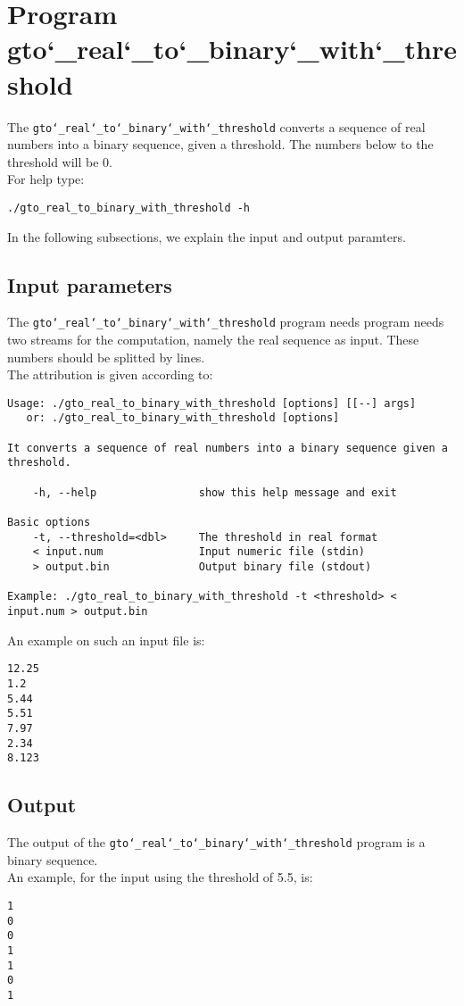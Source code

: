 \section{Program gto\char`_real\char`_to\char`_binary\char`_with\char`_threshold}
The \texttt{gto\char`_real\char`_to\char`_binary\char`_with\char`_threshold} converts a sequence of real numbers into a binary sequence, given a threshold. The numbers below to the threshold will be 0.\\
For help type:
\begin{lstlisting}
./gto_real_to_binary_with_threshold -h
\end{lstlisting}
In the following subsections, we explain the input and output paramters.

\subsection*{Input parameters}

The \texttt{gto\char`_real\char`_to\char`_binary\char`_with\char`_threshold} program needs program needs two streams for the computation, namely the real sequence as input. These numbers should be splitted by lines.\\
The attribution is given according to:
\begin{lstlisting}
Usage: ./gto_real_to_binary_with_threshold [options] [[--] args]
   or: ./gto_real_to_binary_with_threshold [options]

It converts a sequence of real numbers into a binary sequence given a threshold.

    -h, --help                show this help message and exit

Basic options
    -t, --threshold=<dbl>     The threshold in real format
    < input.num               Input numeric file (stdin)
    > output.bin              Output binary file (stdout)

Example: ./gto_real_to_binary_with_threshold -t <threshold> < input.num > output.bin
\end{lstlisting}
An example on such an input file is:
\begin{lstlisting}
12.25
1.2
5.44
5.51
7.97
2.34
8.123
\end{lstlisting}

\subsection*{Output}
The output of the \texttt{gto\char`_real\char`_to\char`_binary\char`_with\char`_threshold} program is a binary sequence.\\
An example, for the input using the threshold of 5.5, is:
\begin{lstlisting}
1
0
0
1
1
0
1
\end{lstlisting}